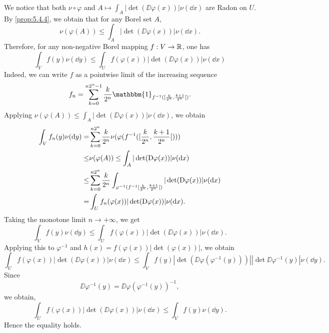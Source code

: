 \begin{proofenv}
    We notice that both $\nu \circ \varphi$ and $A \mapsto \int_{A} |\det(\DD \varphi(x))| \nu(\dd x)$ are Radon on $U$.
    By \ref{prop:5.4.4}, we obtain that for any Borel set $A$,
    $$\nu(\varphi(A)) \le \int_{A} |\det(\DD \varphi(x))|\nu(\dd x).$$
    Therefore, for any non-negative Borel mapping $f : V \rightarrow \mathbb{R}$, one has
    $$\int_{V} f(y) \nu(\dd y) \le \int_{U} f(\varphi(x)) |\det(\DD \varphi(x))|\nu(\dd x)$$
    Indeed, we can write $f$ as a pointwise limit of the increasing sequence
    $$f_n = \sum_{k = 0}^{n2^n - 1}\frac{k}{2^n}\mathbbm{1}_{f^{-1}(\interval[open right]{\frac{k}{2^n}}{\frac{k + 1}{2^n}})}.$$
    Applying $\nu(\varphi(A)) \le \int_{A} |\det(\DD \varphi(x))|\nu(\dd x)$, we obtain
    $$\begin{aligned}
        \int_{V} f_n(y) \nu(\dd y) = & \sum_{k = 0}^{n2^n} \frac{k}{2^n} \nu(\varphi(f^{-1}(\interval[open right]{\frac{k}{2^n}}{\frac{k + 1}{2^n}})))\\
        \le & \nu(\varphi(A)) \le \int_{A} |\det(\DD \varphi(x))|\nu(\dd x)\\
        \le & \sum_{k=0}^{n2^n} \frac{k}{2^n} \int_{\varphi^{-1}(f^{-1}\interval[open right]{\frac{k}{2^n}}{\frac{k + 1}{2^n}})} |\det(\DD \varphi(x))|\nu(\dd x)\\
        = & \int_{U} f_{n} (\varphi(x)) |\det(\DD \varphi(x))|\nu(\dd x).
    \end{aligned}$$
    Taking the monotone limit $n \to +\infty$,
    we get
    $$\int_{V} f(y) \nu(\dd y) \le \int_{U} f(\varphi(x)) |\det(\DD \varphi(x))|\nu(\dd x).$$
    Applying this to $\varphi^{-1}$ and $h(x) = f(\varphi(x))|\det(\varphi(x))|$, we obtain
    $$\int_{U} f(\varphi(x)) |\det(\DD \varphi(x))|\nu(\dd x) \le \int_{V} f(y) |\det(\DD \varphi(\varphi^{-1}(y)))||\det \DD \varphi^{-1}(y)|\nu(\dd y).$$
    Since 
    $$\DD \varphi^{-1} (y) = \DD \varphi(\varphi^{-1}(y))^{-1},$$
    we obtain,
    $$\int_{U} f(\varphi(x)) |\det(\DD \varphi(x))|\nu(\dd x) \le \int_{V} f(y) \nu(\dd y).$$
    Hence the equality holds.
\end{proofenv}
